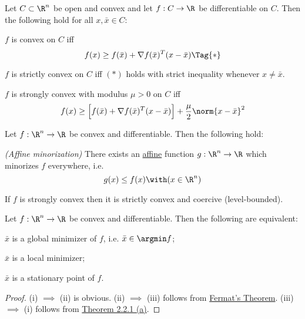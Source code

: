 Let $C\subset\R^n$ be open and convex and let $f:C\to\R$ be differentiable on
$C$. Then the following hold for all $x,\bar x\in C$:
\begin{enumerata}
  \item $f$ is convex on $C$ iff
  \begin{equation*}
    f(x)\geq f(\bar x)+\nabla f(\bar x)^T(x-\bar x)\Tag{*}
  \end{equation*}
  \item $f$ is strictly convex on $C$ iff $(*)$ holds with strict
  inequality whenever $x\neq\bar x$.
  \item $f$ is strongly convex with modulus $\mu>0$ on $C$ iff
  $$
    f(x)\geq\Big[f(\bar x)+\nabla f(\bar x)^T(x-\bar x)\Big]
    +\frac\mu2\norm{x-\bar x}^2
  $$
\end{enumerata}

\label{aa63a8a}

Let $f:\R^n\to\R$ be convex and differentiable. Then the following hold:
\begin{enumerata}
  \item \textit{(Affine minorization)} There exists an
  \href{dcb7f73}{affine} function $g:\R^n\to\R$ which minorizes
  $f$ everywhere, i.e.
  $$
    g(x)\leq f(x)\with(x\in\R^n)
  $$
  \item If $f$ is strongly convex then it is strictly convex and coercive
  (level-bounded).
\end{enumerata}

\label{f2986e2}

Let $f:\R^n\to\R$ be convex and differentiable. Then the following are
equivalent:
\begin{enumerati}
  \item $\bar x$ is a global minimizer of $f$, i.e. $\bar x\in\argmin f$;
  \item $\bar x$ is a local minimizer;
  \item $\bar x$ is a stationary point of $f$.
\end{enumerati}

\begin{proof}
  (i) $\implies$ (ii) is obvious. (ii) $\implies$ (iii) follows from
  \href{dc165c9}{Fermat's Theorem}. (iii) $\implies$ (i) follows
  from \href{cd9cea7}{Theorem 2.2.1 (a)}.
\end{proof}

\label{a8ddd0c}

